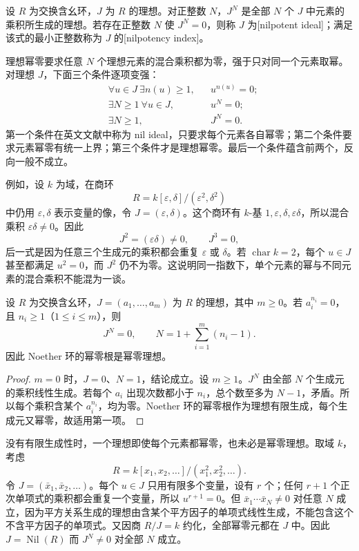 \begin{definition}\label{b3:def:nilpotent-ideal}
	设 \(R\) 为交换含幺环，\(J\) 为 \(R\) 的理想。对正整数 \(N\)，\(J^N\) 是全部 \(N\) 个 \(J\) 中元素的乘积所生成的理想。若存在正整数 \(N\) 使 \(J^N=0\)，则称 \(J\) 为[nilpotent ideal]；满足该式的最小正整数称为 \(J\) 的[nilpotency index]。
\end{definition}

理想幂零要求任意 \(N\) 个理想元素的混合乘积都为零，强于只对同一个元素取幂。对理想 \(J\)，下面三个条件逐项变强：
\[
	\begin{aligned}
		&\forall u\in J\ \exists n(u)\ge1, &&u^{n(u)}=0;\\
		&\exists N\ge1\ \forall u\in J, &&u^N=0;\\
		&\exists N\ge1, &&J^N=0.
	\end{aligned}
\]
第一个条件在英文文献中称为 nil ideal，只要求每个元素各自幂零；第二个条件要求元素幂零有统一上界；第三个条件才是理想幂零。最后一个条件蕴含前两个，反向一般不成立。

\ProseParagraphBreak
例如，设 \(k\) 为域，在商环
\[
	R=k[\varepsilon,\delta]/(\varepsilon^2,\delta^2)
\]
中仍用 \(\varepsilon,\delta\) 表示变量的像，令 \(J=(\varepsilon,\delta)\)。这个商环有 \(k\)-基 \(1,\varepsilon,\delta,\varepsilon\delta\)，所以混合乘积 \(\varepsilon\delta\ne0\)。因此
\[
	J^2=(\varepsilon\delta)\ne0,\qquad J^3=0,
\]
后一式是因为任意三个生成元的乘积都会重复 \(\varepsilon\) 或 \(\delta\)。若 \(\operatorname{char}k=2\)，每个 \(u\in J\) 甚至都满足 \(u^2=0\)，而 \(J^2\) 仍不为零。这说明同一指数下，单个元素的幂与不同元素的混合乘积不能混为一谈。

\begin{proposition}\label{b3:prop:finite-nil-ideal}
	设 \(R\) 为交换含幺环，\(J=(a_1,\ldots,a_m)\) 为 \(R\) 的理想，其中 \(m\ge0\)。若 \(a_i^{n_i}=0\)，且 \(n_i\ge1\)（\(1\le i\le m\)），则
	\[
		J^N=0,\qquad N=1+\sum_{i=1}^m(n_i-1).
	\]
	因此 Noether 环的幂零根是幂零理想。
\end{proposition}
\begin{proof}
	\(m=0\) 时，\(J=0\)、\(N=1\)，结论成立。设 \(m\ge1\)。\(J^N\) 由全部 \(N\) 个生成元的乘积线性生成。若每个 \(a_i\) 出现次数都小于 \(n_i\)，总个数至多为 \(N-1\)，矛盾。所以每个乘积含某个 \(a_i^{n_i}\)，均为零。Noether 环的幂零根作为理想有限生成，每个生成元又幂零，故适用第一项。
\end{proof}

没有有限生成性时，一个理想即使每个元素都幂零，也未必是幂零理想。取域 \(k\)，考虑
\[
	R=k[x_1,x_2,\ldots]/(x_1^2,x_2^2,\ldots).
\]
令 \(J=(\bar x_1,\bar x_2,\ldots)\)。每个 \(u\in J\) 只用有限多个变量，设有 \(r\) 个；任何 \(r+1\) 个正次单项式的乘积都会重复一个变量，所以 \(u^{r+1}=0\)。但 \(\bar x_1\cdots\bar x_N\ne0\) 对任意 \(N\) 成立，因为平方关系生成的理想由含某个平方因子的单项式线性生成，不能包含这个不含平方因子的单项式。又因商 \(R/J=k\) 约化，全部幂零元都在 \(J\) 中。因此 \(J=\operatorname{Nil}(R)\) 而 \(J^N\ne0\) 对全部 \(N\) 成立。

